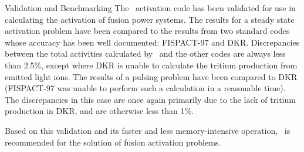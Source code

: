 \begin{chapter}{Validation and Benchmarking}
The \ALARA\ activation code has been validated for use in calculating
the activation of fusion power systems.  The results for a steady
state activation problem have been compared to the results from two
standard codes whose accuracy has been well
documented\cite{IAEA.bench2.rep}: FISPACT-97 and DKR.
Discrepancies between the total activities calculated by \ALARA\ and the
other codes are always less than 2.5\%, except where DKR is
unable to calculate the tritium production from emitted light ions.
The results of a pulsing problem have been compared to DKR
(FISPACT-97 was unable to perform such a calculation in a reasonable
time).  The discrepancies in this case are once again primarily due to
the lack of tritium production in DKR, and are otherwise less
than 1\%.

Based on this validation and its faster and less memory-intensive
operation, \ALARA\ is recommended for the solution of fusion activation
problems.


\end{chapter}